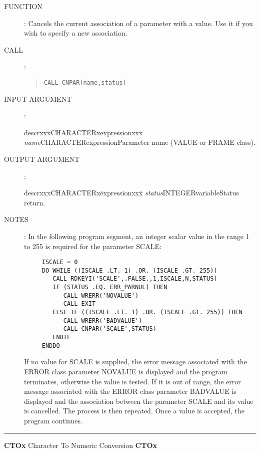 \documentclass{article}
\begin{document}
\begin{description}
\item [FUNCTION]:
Cancels the current association of a parameter with a value.
Use it if you wish to specify a new association.
\item [CALL]:
\begin{quote}
{\tt CALL CNPAR(name,status)}
\end{quote}
\item [INPUT ARGUMENT]:
\begin{tabbing}
descrxxx\=CHARACTERx\=expressionxxx\=\kill
{\em name}\>CHARACTER\>expression\>Parameter name (VALUE or FRAME class).
\end{tabbing}
\item [OUTPUT ARGUMENT]:
\begin{tabbing}
descrxxx\=CHARACTERx\=expressionxxx\=\kill
{\em status}\>INTEGER\>variable\>Status return.
\end{tabbing}
\item [NOTES]:
In the following program segment, an integer scalar value in the range 1 to 255
is required for the parameter SCALE:
\begin{verbatim}
     ISCALE = 0
     DO WHILE ((ISCALE .LT. 1) .OR. (ISCALE .GT. 255))
        CALL RDKEYI('SCALE',.FALSE.,1,ISCALE,N,STATUS)
        IF (STATUS .EQ. ERR_PARNUL) THEN
           CALL WRERR('NOVALUE')
           CALL EXIT
        ELSE IF ((ISCALE .LT. 1) .OR. (ISCALE .GT. 255)) THEN
           CALL WRERR('BADVALUE')
           CALL CNPAR('SCALE',STATUS)
        ENDIF
     ENDDO
\end{verbatim}
If no value for SCALE is supplied, the error message associated with the ERROR
class parameter NOVALUE is displayed and the program terminates, otherwise the
value is tested.
If it is out of range, the error message associated with the ERROR class
parameter BADVALUE is displayed and the association between the parameter SCALE
and its value is  cancelled.
The process is then repeated.
Once a value is accepted, the program continues.
\end{description}
\rule{\textwidth}{0.3mm}
{\Large {\bf CTOx} \hfill Character To Numeric Conversion \hfill {\bf CTOx}}
\end{document}

